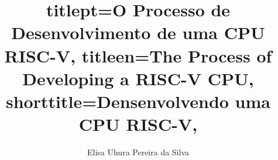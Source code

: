 


\title{
    titlept={O Processo de Desenvolvimento de uma CPU RISC-V},
    titleen={The Process of Developing a RISC-V CPU},
    shorttitle={Densenvolvendo uma CPU RISC-V},
}

\author[fem]{Elisa Uhura Pereira da Silva}



